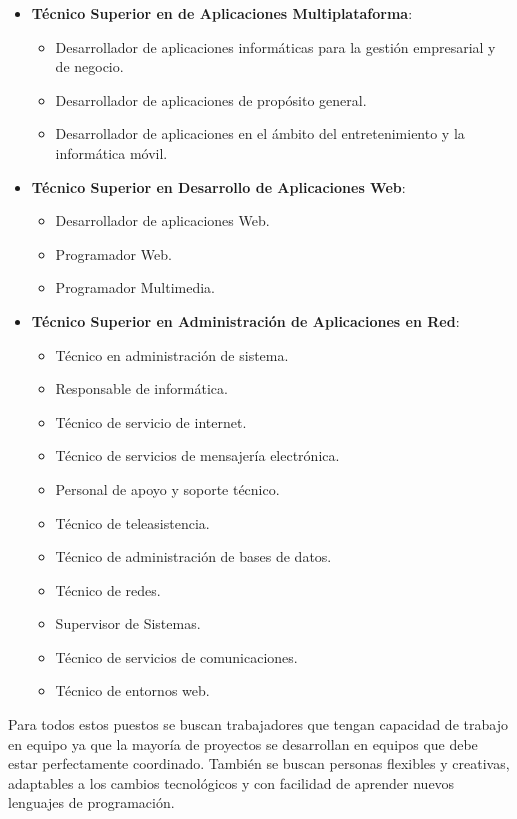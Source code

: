 \begin{itemize}
    \item \textbf{Técnico Superior en de Aplicaciones Multiplataforma}:
    \begin{itemize}
        \item Desarrollador de aplicaciones informáticas para la gestión empresarial y de negocio.
        \item Desarrollador de aplicaciones de propósito general.
        \item Desarrollador de aplicaciones en el ámbito del entretenimiento y la informática móvil.
    \end{itemize}
    \item \textbf{Técnico Superior en Desarrollo de Aplicaciones Web}:
    \begin{itemize}
        \item Desarrollador de aplicaciones Web.
        \item Programador Web.
        \item Programador Multimedia.
    \end{itemize}
    \item \textbf{Técnico Superior en Administración de Aplicaciones en Red}:
    \begin{itemize}
        \item Técnico en administración de sistema.
        \item Responsable de informática.
        \item Técnico de servicio de internet.
        \item Técnico de servicios de mensajería electrónica.
        \item Personal de apoyo y soporte técnico.
        \item Técnico de teleasistencia.
        \item Técnico de administración de bases de datos.
        \item Técnico de redes.
        \item Supervisor de Sistemas.
        \item Técnico de servicios de comunicaciones.
        \item Técnico de entornos web.
    \end{itemize}
 \end{itemize}

Para todos estos puestos se buscan trabajadores que tengan capacidad de trabajo en equipo ya que la mayoría de proyectos se desarrollan en equipos que debe estar perfectamente coordinado. También se buscan personas flexibles y creativas, adaptables a los cambios tecnológicos y con facilidad de aprender nuevos lenguajes de programación.

